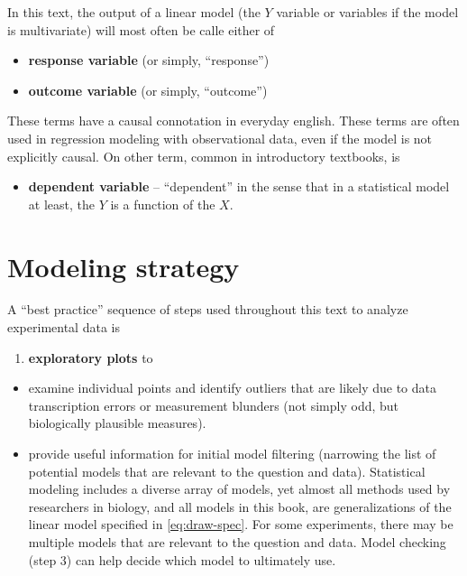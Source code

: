 \documentclass[]{book}
\providecommand{\tightlist}{%
  \setlength{\itemsep}{0pt}\setlength{\parskip}{0pt}}
\begin{document}
In this text, the output of a linear model (the \(Y\) variable or variables if the model is multivariate) will most often be calle either of

\begin{itemize}
\tightlist
\item
  \textbf{response variable} (or simply, ``response'')
\item
  \textbf{outcome variable} (or simply, ``outcome'')
\end{itemize}

These terms have a causal connotation in everyday english. These terms are often used in regression modeling with observational data, even if the model is not explicitly causal. On other term, common in introductory textbooks, is

\begin{itemize}
\tightlist
\item
  \textbf{dependent variable} -- ``dependent'' in the sense that in a statistical model at least, the \(Y\) is a function of the \(X\).
\end{itemize}

\hypertarget{modeling-strategy}{%
\section{Modeling strategy}\label{modeling-strategy}}

A ``best practice'' sequence of steps used throughout this text to analyze experimental data is

\begin{enumerate}
\def\labelenumi{\arabic{enumi}.}
\tightlist
\item
  \textbf{exploratory plots} to
\end{enumerate}

\begin{itemize}
\tightlist
\item
  examine individual points and identify outliers that are likely due to data transcription errors or measurement blunders (not simply odd, but biologically plausible measures).
\item
  provide useful information for initial model filtering (narrowing the list of potential models that are relevant to the question and data). Statistical modeling includes a diverse array of models, yet almost all methods used by researchers in biology, and all models in this book, are generalizations of the linear model specified in \eqref{eq:draw-spec}. For some experiments, there may be multiple models that are relevant to the question and data. Model checking (step 3) can help decide which model to ultimately use.
\end{itemize}
\end{document}
